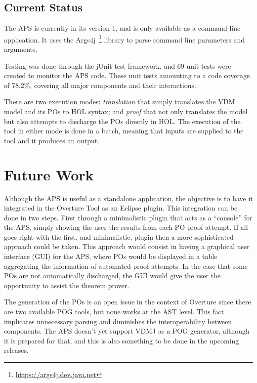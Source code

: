 \documentclass[]{article}
\begin{document}
\subsection{Current Status}

The APS is currently in its version 1, and is only available as a command line application.
It uses the Args4j~\footnote{\url{https://args4j.dev.java.net}} library to parse command line parameters and arguments.

Testing was done through the jUnit test framework, and 69 unit tests were created to monitor the APS code.
These unit tests amounting to a code coverage of 78.2\%, covering all major components and their interactions.

There are two execution modes: \emph{translation} that simply translates the VDM model and its POs to HOL syntax; and \emph{proof} that not only translates the model but also attempts to discharge the POs directly in HOL.
The execution of the tool in either mode is done in a batch, meaning that inputs are supplied to the tool and it produces an output.

\section{Future Work}
\label{sec:future_work}

Although the APS is useful as a standalone application, the objective is to have it integrated in the Overture Tool as an Eclipse plugin.
This integration can be done in two steps. 
First through a minimalistic plugin that acts as a ``console'' for the APS, simply showing the user the results from each PO proof attempt.
If all goes right with the first, and minimalistic, plugin then a more sophisticated approach could be taken.
This approach would consist in having a graphical user interface (GUI) for the APS, where POs would be displayed in a table aggregating the information of automated proof attempts.
In the case that some POs are not automatically discharged, the GUI would give the user the opportunity to assist the theorem prover.



The generation of the POs is an open issue in the context of Overture since there are two available POG tools, but none works at the AST level.
This fact implicates unnecessary parsing and diminishes the interoperability between components.
The APS doesn't yet support VDMJ as a POG generator, although it is prepared for that, and this is also something to be done in the upcoming releases.
\end{document}
